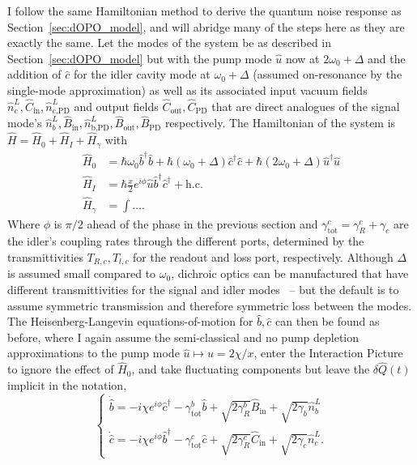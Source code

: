 I follow the same Hamiltonian method to derive the quantum noise response as Section~\ref{sec:dOPO_model}, and will abridge many of the steps here as they are exactly the same. Let the modes of the system be as described in Section~\ref{sec:dOPO_model} but with the pump mode $\hat u$ now at $2\omega_0+\Delta$ and the addition of $\hat c$ for the idler cavity mode at $\omega_0+\Delta$ (assumed on-resonance by the single-mode approximation) as well as its associated input vacuum fields $\hat n^L_c, \hat C_\text{in}, \hat n^L_\text{c,PD}$ and output fields $\hat C_\text{out}, \hat C_\text{PD}$ that are direct analogues of the signal mode's $\hat n^L_b, \hat B_\text{in}, \hat n^L_\text{b,PD}, \hat B_\text{out}, \hat B_\text{PD}$ respectively. The Hamiltonian of the system is $\hat H = \hat H_0+\hat H_I+\hat H_\gamma$ with 
\begin{align}
\hat H_0 &= \hbar \omega_0 \hat b^\dag \hat b + \hbar (\omega_0+\Delta) \hat c^\dag \hat c + \hbar (2\omega_0+\Delta) \hat u^\dag \hat u\\
\hat H_I &= \hbar \frac{x}{2} e^{i\phi} \hat u \hat b^\dag \hat c^\dag + \text{h.c.}\\
\hat H_\gamma &= \int \ldots .
\end{align}
Where $\phi$ is $\pi/2$ ahead of the phase in the previous section  and $\gamma^c_\text{tot}=\gamma^c_R+\gamma_c$ are the idler's coupling rates through the different ports, determined by the transmittivities $T_{R,c}, T_{l,c}$ for the readout and loss port, respectively. Although $\Delta$ is assumed small compared to $\omega_0$, dichroic optics can be manufactured that have different transmittivities for the signal and idler modes~\cite{} -- but the default is to assume symmetric transmission and therefore symmetric loss between the modes. The Heisenberg-Langevin equations-of-motion for $\hat b, \hat c$ can then be found as before, where I again assume the semi-classical and no pump depletion approximations to the pump mode $\hat u\mapsto u=2\chi/x$, enter the Interaction Picture to ignore the effect of $\hat H_0$, and take fluctuating components but leave the $\delta \hat Q(t)$ implicit in the notation,
$$\begin{cases}
\dot{\hat{b}}=-i\chi e^{i\phi}\hat{c}^\dagger - \gamma^b_\mathrm{tot} \hat{b} + \sqrt{2\gamma^b_R}\hat{B}_\mathrm{in} + \sqrt{2\gamma_b}\hat{n}^L_b\\
\dot{\hat{c}}=-i\chi e^{i\phi}\hat{b}^\dagger - \gamma^c_\mathrm{tot} \hat{c} + \sqrt{2\gamma^c_R}\hat{C}_\mathrm{in} + \sqrt{2\gamma_c}\hat{n}^L_c.
\end{cases}$$
